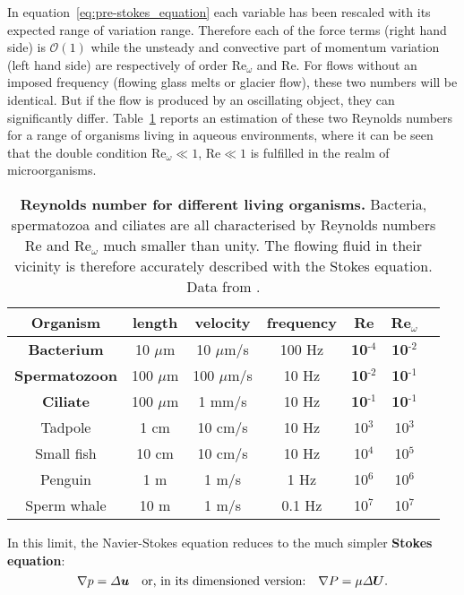 In equation~\eqref{eq:pre-stokes_equation} each variable has been rescaled with its expected range of variation range. Therefore each of the force terms (right hand side) is $\mathcal O(1)$ while the unsteady and convective part of momentum variation (left hand side) are respectively of order $\mathrm{Re}_\omega$ and $\mathrm{Re}$. For flows without an imposed frequency (flowing glass melts or glacier flow), these two numbers will be identical. But if the flow is produced by an oscillating object, they can significantly differ. Table~\ref{tbl:Reynolds} reports an estimation of these two Reynolds numbers for a range of organisms living in aqueous environments, where it can be seen that the double condition $\mathrm{Re}_\omega\ll 1$, $\mathrm{Re}\ll 1$ is fulfilled in the realm of microorganisms.
\begin{table}
\begin{center}
\begin{tabular}{ccccccc}
Organism & length & velocity & frequency & Re & Re$_\omega$\\
\hline\hline
\textbf{Bacterium} & 10 $\mu$m & 10 $\mu$m/s & 100 Hz & \textbf{10$^\text{-4}$} & \textbf{10$^\text{-2}$}\\
\textbf{Spermatozoon} & 100 $\mu$m & 100 $\mu$m/s & 10 Hz & \textbf{10$^\text{-2}$} & \textbf{10$^\text{-1}$}\\
\textbf{Ciliate} & 100 $\mu$m & 1 mm/s & 10 Hz & \textbf{10$^\text{-1}$} & \textbf{10$^\text{-1}$}\\
Tadpole & 1 cm & 10 cm/s & 10 Hz & 10$^\text{3}$ & 10$^\text{3}$\\
Small fish & 10 cm & 10 cm/s & 10 Hz & 10$^\text{4}$ & 10$^\text{5}$\\
Penguin & 1 m & 1 m/s & 1 Hz & 10$^\text{6}$ & 10$^\text{6}$\\
Sperm whale & 10 m & 1 m/s & 0.1 Hz & 10$^\text{7}$ & 10$^\text{7}$\\
\hline
\end{tabular}
\end{center}
\caption{\textbf{Reynolds number for different living organisms.} Bacteria, spermatozoa and ciliates are all characterised by Reynolds numbers Re and Re$_\omega$ much smaller than unity. The flowing fluid in their vicinity is therefore accurately described with the Stokes equation. Data from \citet{Lauga2020}.}
\label{tbl:Reynolds}
\end{table}

In this limit, the Navier-Stokes equation reduces to the much simpler \textbf{Stokes equation}:
\begin{equation}
\nabla p=\Delta \bu\quad\text{or, in its dimensioned version:}\quad\nabla P=\mu\Delta \bU.
\end{equation}

